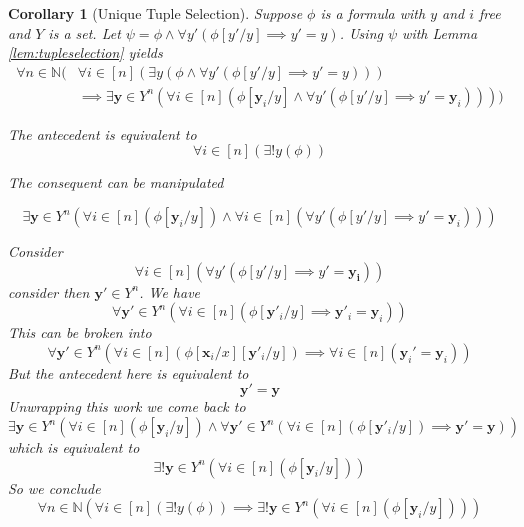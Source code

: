 \documentclass[12pt]{article}
\theoremstyle{break}
\theoremstyle{break}
\theoremstyle{break}
\newtheorem{corollary}[theorem]{Corollary}
\theoremstyle{break}
\theoremstyle{break}
\newtheorem{informal definition}[definition]{Informal Definition}
\newcommand{\bv}[1]{\boldsymbol{#1}}
\begin{document}
\begin{corollary}[Unique Tuple Selection]
\label{cor:uniquetupleselection}
Suppose $\phi$ is a formula with $y$ and $i$ free and $Y$ is a set.
Let $\psi = \phi \land \forall y' (\phi[y'/y] \implies y'=y)$.
Using $\psi$ with Lemma \ref{lem:tupleselection} yields
\begin{align*}
\forall n \in \mathbb{N} \big(& \forall i \in [n] (\exists y(\phi \land \forall y' (\phi[y'/y] \implies y'=y)))\\
& \implies \exists \bv{y}\in Y^n(\forall i \in [n](\phi[\bv{y}_i/y] \land \forall y' (\phi[y'/y] \implies y'=\bv{y}_i))) \big)
\end{align*}

The antecedent is equivalent to
$$
\forall i \in [n] (\exists!y (\phi))
$$

The consequent can be manipulated

$$
\exists \bv{y} \in Y^n (\forall i \in [n](\phi[\bv{y}_i/y])\land \forall i\in [n](\forall y'(\phi[y'/y] \implies y'=\bv{y}_i)))
$$

Consider
$$
\forall i \in [n] (\forall y' (\phi[y'/y] \implies y' = \bv{y_i}))
$$
consider then $\bv{y}' \in Y^n$.
We have
$$
\forall \bv{y}' \in Y^n (\forall i \in [n](\phi[\bv{y}'_i/y] \implies \bv{y}'_i = \bv{y}_i))
$$
This can be broken into
$$
\forall \bv{y}' \in Y^n (\forall i \in [n](\phi[\bv{x}_i/x][\bv{y}'_i/y]) \implies \forall i \in [n](\bv{y}_i' = \bv{y}_i))
$$
But the antecedent here is equivalent to
$$
\bv{y}' = \bv{y}
$$
Unwrapping this work we come back to
$$
\exists \bv{y}\in Y^n(\forall i \in [n](\phi[\bv{y}_i/y])\land \forall \bv{y}'\in Y^n(\forall i \in [n](\phi[\bv{y}'_i/y]) \implies \bv{y}' = \bv{y}))
$$
which is equivalent to
$$
\exists! \bv{y}\in Y^n (\forall i \in [n](\phi[\bv{y}_i/y]))
$$
So we conclude
$$
\forall n \in \mathbb{N} (\forall i\in [n] (\exists! y(\phi)) \implies \exists! \bv{y}\in Y^n(\forall i \in [n](\phi[\bv{y}_i/y])))
$$

\end{corollary}
\end{document}

